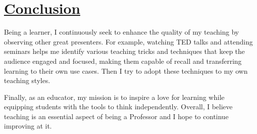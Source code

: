 \documentclass[a4paper,10pt]{article}
\begin{document}
\section*{\underline{Conclusion}}

Being a learner, I continuously seek to enhance the quality of my teaching by observing other great presenters. For example, watching TED talks and attending seminars helps me identify various teaching tricks and techniques that keep the audience engaged and focused, making them capable of recall and transferring learning to their own use cases. Then I try to adopt these techniques to my own teaching styles.

Finally, as an educator, my mission is to inspire a love for learning while equipping students with the tools to think independently. Overall, I believe teaching is an essential aspect of being a Professor and I hope to continue improving at it.
\end{document}
